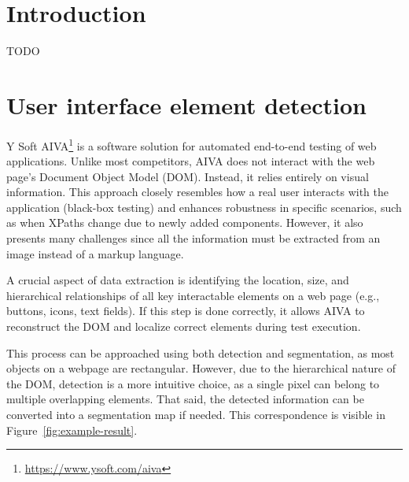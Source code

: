 \documentclass[
  digital,     %
  oneside,     %
  nosansbold,  %
  nocolorbold, %
  lof,         %
  lot,         %
]{fithesis4}
\begin{document}
\chapter*{Introduction}

TODO

\chapter{User interface element detection}

Y Soft AIVA\footnote{\url{https://www.ysoft.com/aiva}} is a software solution for automated end-to-end testing of web applications. Unlike most competitors, AIVA does not interact with the web page's Document Object Model (DOM). Instead, it relies entirely on visual information. This approach closely resembles how a real user interacts with the application (black-box testing) and enhances robustness in specific scenarios, such as when XPaths change due to newly added components. However, it also presents many challenges since all the information must be extracted from an image instead of a markup language.

A crucial aspect of data extraction is identifying the location, size, and hierarchical relationships of all key interactable elements on a web page (e.g., buttons, icons, text fields). If this step is done correctly, it allows AIVA to reconstruct the DOM and localize correct elements during test execution.

This process can be approached using both detection and segmentation, as most objects on a webpage are rectangular. However, due to the hierarchical nature of the DOM, detection is a more intuitive choice, as a single pixel can belong to multiple overlapping elements. That said, the detected information can be converted into a segmentation map if needed. This correspondence is visible in Figure~\ref{fig:example-result}.
\end{document}
